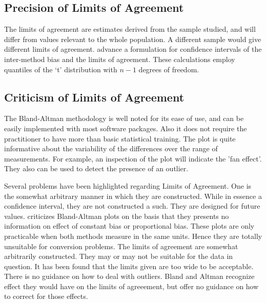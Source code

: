 \documentclass[12pt, a4paper]{report}
\theoremstyle{plain}
\theoremstyle{definition}
\theoremstyle{remark}
\begin{document}

\subsection{Precision of Limits of Agreement}
The limits of agreement are estimates derived from the sample
studied, and will differ from values relevant to the whole
population. A different sample would give different limits of
agreement. \citet*{BA86} advance a formulation for confidence
intervals of the inter-method bias and the limits of agreement.
These calculations employ quantiles of the `t' distribution with
$n -1$ degrees of freedom.





\subsection{Criticism of Limits of Agreement }
The Bland-Altman methodology is well noted for its ease of use,
and can be easily implemented with most software packages. Also it
does not require the practitioner to have more than basic
statistical training. The plot is quite informative about the
variability of the differences over the range of measurements. For
example, an inspection of the plot will indicate the 'fan effect'.
They also can be used to detect the presence of an outlier.


Several problems have been highlighted regarding Limits of Agreement. One is the somewhat arbitrary manner in which they are
constructed. While in essence a confidence interval, they are not constructed a such. They are designed for future values.
\citet{ludbrook97,ludbrook02} criticizes Bland-Altman plots on the
basis that they presents no information on effect of constant bias
or proportional bias. These plots are only practicable when both
methods measure in the same units. Hence they are totally
unsuitable for conversion problems. The limits of agreement are
somewhat arbitrarily constructed. They may or may not be suitable
for the data in question. It has been found that the limits given
are too wide to be acceptable. There is no guidance on how to deal
with outliers. Bland and Altman recognize effect they would have
on the limits of agreeement, but offer no guidance on how to
correct for those effects.	
\end{document}
